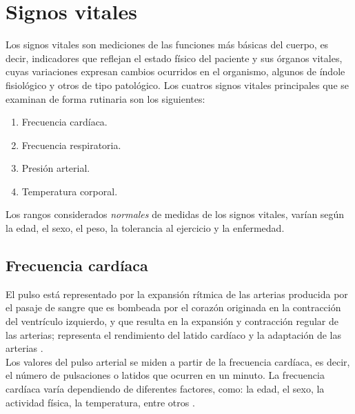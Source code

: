 \section{Signos vitales}
	Los signos vitales son mediciones de las funciones más básicas del cuerpo, es decir, indicadores que reflejan el estado físico del paciente y sus órganos vitales, cuyas variaciones expresan cambios ocurridos en el organismo, algunos de índole fisiológico y otros de tipo patológico. \cite{aguayoChile} \cite{cobo2011} 
	Los cuatros signos vitales principales que se examinan de forma rutinaria son los siguientes:
	
	\begin{enumerate}
		\item Frecuencia cardíaca.
		\item Frecuencia respiratoria.
		\item Presión arterial.
		\item Temperatura corporal.
	\end{enumerate}

	Los rangos considerados \textit{normales} de medidas de los signos vitales, varían según la edad, el sexo, el peso, la tolerancia al ejercicio y la enfermedad.
	
	\subsection{Frecuencia cardíaca}
	El pulso está representado por la expansión rítmica de las arterias producida por el pasaje de sangre que es bombeada por el corazón originada en la contracción del ventrículo izquierdo, y que resulta en la expansión y contracción regular de las arterias; representa el rendimiento del latido cardíaco y la adaptación de las arterias \cite{aguayoChile} \cite{signos2017}. \\
	
	Los valores del pulso arterial se miden a partir de la frecuencia cardíaca, es decir, el número de pulsaciones o latidos que ocurren en un minuto. La frecuencia cardíaca varía dependiendo de diferentes factores, como: la edad, el sexo, la actividad física, la temperatura, entre otros \cite{valoresFreq}.
	
